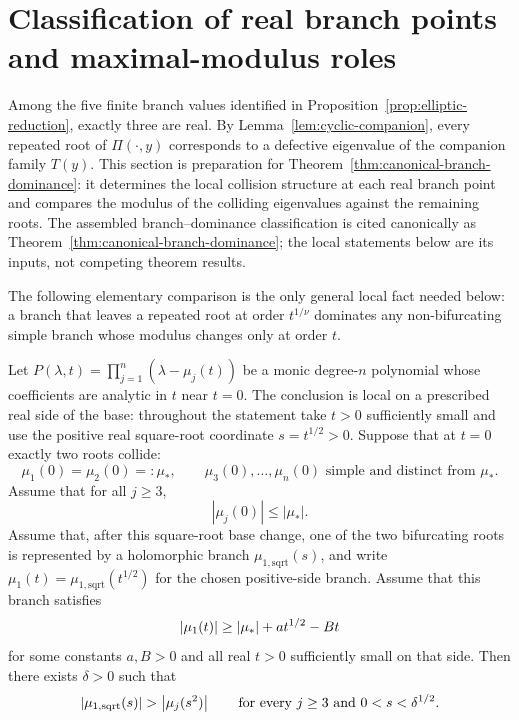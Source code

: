\section{Classification of real branch points and maximal-modulus roles}\label{sec:ep-classification}

Among the five finite branch values identified in Proposition~\ref{prop:elliptic-reduction}, exactly three are real.
By Lemma~\ref{lem:cyclic-companion}, every repeated root of \(\Pi(\cdot,y)\) corresponds to a defective eigenvalue of the companion family \(T(y)\).
This section is preparation for Theorem~\ref{thm:canonical-branch-dominance}: it determines the local collision structure at each real branch point and compares the modulus of the colliding eigenvalues against the remaining roots.
The assembled branch--dominance classification is cited canonically as Theorem~\ref{thm:canonical-branch-dominance}; the local statements below are its inputs, not competing theorem results.

The following elementary comparison is the only general local fact needed below:
a branch that leaves a repeated root at order \(t^{1/\nu}\) dominates any non-bifurcating simple branch whose modulus changes only at order \(t\).

\begin{lemma}\label{lem:local-dominance}
Let \(P(\lambda,t)=\prod_{j=1}^n(\lambda-\mu_j(t))\) be a monic degree-\(n\) polynomial whose coefficients are analytic in \(t\) near \(t=0\).
The conclusion is local on a prescribed real side of the base: throughout the statement take \(t>0\) sufficiently small and use the positive real square-root coordinate \(s=t^{1/2}>0\).
Suppose that at \(t=0\) exactly two roots collide:
\[
\mu_1(0)=\mu_2(0)=:\mu_*,
\qquad
\mu_3(0),\dots,\mu_n(0) \text{ simple and distinct from } \mu_*.
\]
Assume that for all \(j\ge 3\),
\begin{equation}\label{eq:local-dominance-hyp}
|\mu_j(0)|\le |\mu_*|.
\end{equation}
Assume that, after this square-root base change, one of the two bifurcating roots is represented by a holomorphic branch \(\mu_{1,\mathrm{sqrt}}(s)\), and write \(\mu_1(t)=\mu_{1,\mathrm{sqrt}}(t^{1/2})\) for the chosen positive-side branch.
Assume that this branch satisfies
\begin{equation}\label{eq:bifurc-form}
\left\lvert \mu_1(t)\right\rvert \ge \left\lvert \mu_*\right\rvert + a t^{1/2} - B t
\end{equation}
for some constants \(a,B>0\) and all real \(t>0\) sufficiently small on that side.
Then there exists \(\delta>0\) such that
\begin{equation}\label{eq:local-dominance-concl}
\left\lvert \mu_{1,\mathrm{sqrt}}(s)\right\rvert>\left\lvert \mu_j(s^2)\right\rvert
\qquad\text{for every } j\ge 3 \text{ and } 0<s<\delta^{1/2}.
\end{equation}
\end{lemma}

